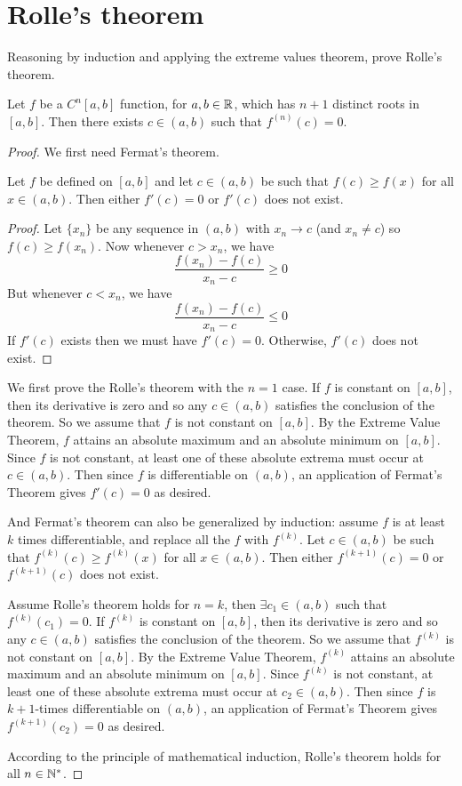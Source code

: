 \section{Rolle's theorem}
Reasoning by induction and applying the extreme values theorem, prove Rolle's theorem.
\begin{theorem}
\label{rolle}
Let $f$ be a \(C^n[a, b]\) function, for \(a,b\in\mathbb{R}\), which has $n+1$ distinct roots in \([a,b]\).
Then there exists \(c \in (a, b)\) such that \(f^{(n)}(c)=0\).
\end{theorem}
\begin{proof}
We first need Fermat's theorem.
\begin{theorem}
Let $f$ be defined on \([a,b]\) and let \(c\in(a,b)\) be such that \(f(c)\geq f(x)\) for all \(x\in(a,b)\).
Then either \(f'(c)=0\) or \(f'(c)\) does not exist.
\end{theorem}
\begin{proof}
Let \(\{x_n\}\) be any sequence in \((a,b)\) with \(x_n\to c\) (and \(x_n\neq c\)) so \(f(c)\geq f(x_n)\).
Now whenever \(c>x_n\), we have
\[ \frac{f(x_n)-f(c)}{x_n-c}\geq0 \]
But whenever \(c<x_n\), we have
\[ \frac{f(x_n)-f(c)}{x_n-c}\leq0 \]
If \(f'(c)\) exists then we must have \(f'(c)=0\).
Otherwise, \(f'(c)\) does not exist.
\end{proof}
We first prove the Rolle's theorem with the \(n=1\) case.
If $f$ is constant on \([a,b]\), then its derivative is zero and so any \(c\in(a,b)\) satisfies the conclusion of the theorem.
So we assume that $f$ is not constant on \([a,b]\).
By the Extreme Value Theorem, $f$ attains an absolute maximum and an absolute minimum on \([a,b]\).
Since $f$ is not constant, at least one of these absolute extrema must occur at \(c\in(a,b)\).
Then since $f$ is differentiable on \((a,b)\), an application of Fermat's Theorem gives \(f'(c)=0\) as desired.

And Fermat's theorem can also be generalized by induction:
assume $f$ is at least $k$ times differentiable, and replace all the $f$ with \(f^{(k)}\).
Let \(c\in(a,b)\) be such that \(f^{(k)}(c)\geq f^{(k)}(x)\) for all \(x\in(a,b)\).
Then either \(f^{(k+1)}(c)=0\) or \(f^{(k+1)}(c)\) does not exist.

Assume Rolle's theorem holds for \(n=k\), then \(\exists c_1\in(a,b)\) such that \(f^{(k)}(c_1)=0\).
If \(f^{(k)}\) is constant on \([a,b]\), then its derivative is zero and so any \(c\in(a,b)\) satisfies the conclusion of the theorem.
So we assume that \(f^{(k)}\) is not constant on \([a,b]\).
By the Extreme Value Theorem, \(f^{(k)}\) attains an absolute maximum and an absolute minimum on \([a,b]\).
Since \(f^{(k)}\) is not constant, at least one of these absolute extrema must occur at \(c_2\in(a,b)\).
Then since $f$ is \(k+1\)-times differentiable on \((a,b)\), an application of Fermat's Theorem gives \(f^{(k+1)}(c_2)=0\) as desired.

According to the principle of mathematical induction, Rolle's theorem holds for all \(n\in\mathbb{N}^*\).
\end{proof}


